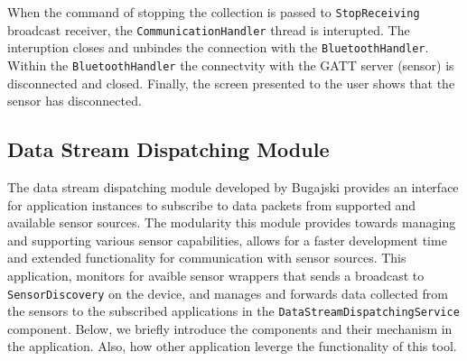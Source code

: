 When the command of stopping the collection is passed to \verb|StopReceiving| broadcast receiver, the \verb|CommunicationHandler| thread is interupted. The interuption closes and unbindes the connection with the \verb|BluetoothHandler|. Within the \verb|BluetoothHandler| the connectvity with the GATT server (sensor) is disconnected and closed. Finally, the screen presented to the user shows that the sensor has disconnected.

\subsection{Data Stream Dispatching Module}
The data stream dispatching module developed by Bugajski provides an interface for application instances to subscribe to data packets from supported and available sensor sources. The modularity this module provides towards managing and supporting various sensor capabilities, allows for a faster development time and extended functionality for communication with sensor sources. This application, monitors for avaible sensor wrappers that sends a broadcast to \verb|SensorDiscovery| on the device, and manages and forwards data collected from the sensors to the subscribed applications in the \verb|DataStreamDispatchingService| component. Below, we briefly introduce the components and their mechanism in the application. Also, how other application leverge the functionality of this tool. 

